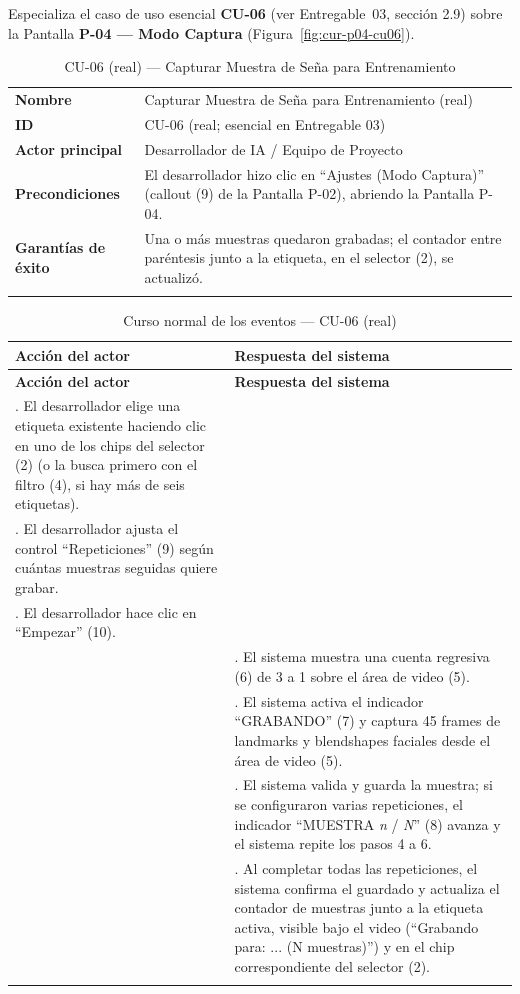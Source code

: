 Especializa el caso de uso esencial \textbf{CU-06} (ver Entregable~03,
sección 2.9) sobre la Pantalla \textbf{P-04 --- Modo Captura}
(Figura~\ref{fig:cur-p04-cu06}).


\begin{longtable}{@{}p{4.1cm} >{\raggedright\arraybackslash}p{11.2cm}@{}}
\toprule
\textbf{Nombre} & Capturar Muestra de Seña para Entrenamiento (real) \\
\textbf{ID} & CU-06 (real; esencial en Entregable 03) \\
\textbf{Actor principal} & Desarrollador de IA / Equipo de Proyecto \\
\textbf{Precondiciones} &
El desarrollador hizo clic en ``Ajustes (Modo Captura)'' (callout (9) de
la Pantalla P-02), abriendo la Pantalla P-04. \\
\textbf{Garantías de éxito} &
Una o más muestras quedaron grabadas; el contador entre paréntesis junto
a la etiqueta, en el selector (2), se actualizó. \\
\bottomrule
\caption{CU-06 (real) — Capturar Muestra de Seña para Entrenamiento}
\end{longtable}

\setlength{\extrarowheight}{5pt}
\begin{longtable}{@{}>{\raggedright\arraybackslash}p{} >{\raggedright\arraybackslash}p{}@{}}
\toprule
\textbf{Acción del actor} & \textbf{Respuesta del sistema} \\
\midrule
\endfirsthead
\toprule
\textbf{Acción del actor} & \textbf{Respuesta del sistema} \\
\midrule
\endhead
1. El desarrollador elige una etiqueta existente haciendo clic en uno de
los chips del selector (2) (o la busca primero con el filtro (4), si hay
más de seis etiquetas). & \\
2. El desarrollador ajusta el control ``Repeticiones'' (9) según cuántas
muestras seguidas quiere grabar. & \\
3. El desarrollador hace clic en ``Empezar'' (10). & \\
&
4. El sistema muestra una cuenta regresiva (6) de 3 a 1 sobre el área de
video (5). \\
&
5. El sistema activa el indicador ``GRABANDO'' (7) y captura 45 frames
de landmarks y blendshapes faciales desde el área de video (5). \\
&
6. El sistema valida y guarda la muestra; si se
configuraron varias repeticiones, el indicador ``MUESTRA \emph{n} /
\emph{N}'' (8) avanza y el sistema repite los pasos 4 a 6. \\
&
7. Al completar todas las repeticiones, el sistema confirma el guardado
y actualiza el contador de muestras junto a la etiqueta activa, visible
bajo el video (``Grabando para: ... (N muestras)'') y en el chip
correspondiente del selector (2). \\
\bottomrule
\caption{Curso normal de los eventos --- CU-06 (real)}
\end{longtable}
\setlength{\extrarowheight}{0pt}

